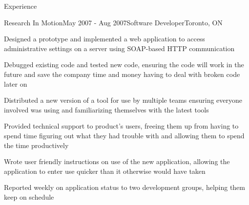 \documentclass{resume}
\begin{document}
\begin{rSection}{Experience}
    \begin{rSubsection}{Research In Motion}{May 2007 - Aug 2007}{Software Developer}{Toronto, ON}
      \item Designed a prototype and implemented a web application to access administrative settings on a server using SOAP-based HTTP communication
      \item Debugged existing code and tested new code, ensuring the code will work in the future and save the company time and money having to deal with broken code later on
      \item Distributed a new version of a tool for use by multiple teams ensuring everyone involved was using and familiarizing themselves with the latest tools
      \item Provided technical support to product’s users, freeing them up from having to spend time figuring out what they had trouble with and allowing them to spend the time productively
      \item Wrote user friendly instructions on use of the new application, allowing the application to enter use quicker than it otherwise would have taken 
      \item Reported weekly on application status to two development groups, helping them keep on schedule
    \end{rSubsection}

\begin{comment}
    \begin{rSubsection}{Artificial Perception Laboratory (APL)}{May 2007 - Aug 2007}{Team Lead}{Toronto, ON}
      \item Conducted a broad range of projects to help further APL’s research, advancing APLs position in the industry
      \item Led a team of five volunteer students, delivering instructions on a weekly basis and gathering progress reports
      \item Reported weekly to coordinator and other team leaders allowing the different teams to complement each other's productivity
    \end{rSubsection}

    \begin{rSubsection}{Rent Magic}{May 2006 - Aug 2006}{Software Developer}{Toronto, ON}
      \item Designed and implemented a PDA based front end and server backend to interact with a MySQL database producing a valuable product for Rent Magic
      \item Designed API structure, application structure and UI layout, data protocol creating a framework that can be used in the future for many other projects
      \item Kept supervisor up to date on progress and impediments, keeping the project on schedule
      \item Tested application, ensuring maximum customer satisfaction
    \end{rSubsection}
\end{comment}

  \end{rSection}
\end{document}
